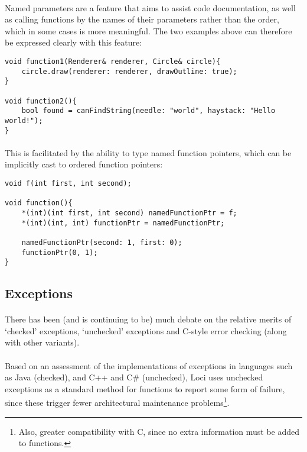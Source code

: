 \documentclass[12pt,twoside,notitlepage]{report}
\begin{document}
\paragraph{}
Named parameters are a feature that aims to assist code documentation, as well as calling functions by the names of their parameters rather than the order, which in some cases is more meaningful. The two examples above can therefore be expressed clearly with this feature:


\begin{lstlisting}
void function1(Renderer& renderer, Circle& circle){
	circle.draw(renderer: renderer, drawOutline: true);
}

void function2(){
	bool found = canFindString(needle: "world", haystack: "Hello world!");
}
\end{lstlisting}


\paragraph{}
This is facilitated by the ability to type named function pointers, which can be implicitly cast to ordered function pointers:


\begin{lstlisting}
void f(int first, int second);

void function(){
	*(int)(int first, int second) namedFunctionPtr = f;
	*(int)(int, int) functionPtr = namedFunctionPtr;
	
	namedFunctionPtr(second: 1, first: 0);
	functionPtr(0, 1);
}
\end{lstlisting}


\clearpage

\subsection{Exceptions}

\paragraph{}
There has been (and is continuing to be) much debate on the relative merits of `checked' exceptions, `unchecked' exceptions and C-style error checking (along with other variants).

\paragraph{}
Based on an assessment of the implementations of exceptions in languages such as Java (checked), and C++ and C\# (unchecked), Loci uses unchecked exceptions as a standard method for functions to report some form of failure, since these trigger fewer architectural maintenance problems\footnote{Also, greater compatibility with C, since no extra information must be added to functions.}.
\end{document}
